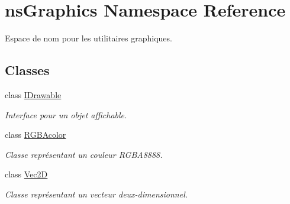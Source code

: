\hypertarget{namespacens_graphics}{}\section{ns\+Graphics Namespace Reference}
\label{namespacens_graphics}


Espace de nom pour les utilitaires graphiques.  


\subsection*{Classes}
\begin{DoxyCompactItemize}
\item 
class \hyperlink{classns_graphics_1_1_i_drawable}{I\+Drawable}
\begin{DoxyCompactList}\small\item\em Interface pour un objet affichable. \end{DoxyCompactList}\item 
class \hyperlink{classns_graphics_1_1_r_g_b_acolor}{R\+G\+B\+Acolor}
\begin{DoxyCompactList}\small\item\em Classe représentant un couleur R\+G\+B\+A8888. \end{DoxyCompactList}\item 
class \hyperlink{classns_graphics_1_1_vec2_d}{Vec2D}
\begin{DoxyCompactList}\small\item\em Classe représentant un vecteur deux-\/dimensionnel. \end{DoxyCompactList}\end{DoxyCompactItemize}
